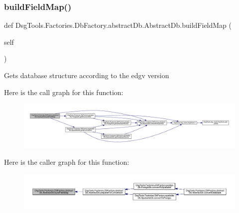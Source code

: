 \subsubsection{\texorpdfstring{build\+Field\+Map()}{buildFieldMap()}}
{\footnotesize\ttfamily def Dsg\+Tools.\+Factories.\+Db\+Factory.\+abstract\+Db.\+Abstract\+Db.\+build\+Field\+Map (\begin{DoxyParamCaption}\item[{}]{self }\end{DoxyParamCaption})}

\begin{DoxyVerb}Gets database structure according to the edgv version
\end{DoxyVerb}
 Here is the call graph for this function\+:
\nopagebreak
\begin{figure}[H]
\begin{center}
\leavevmode
\includegraphics[width=350pt]{class_dsg_tools_1_1_factories_1_1_db_factory_1_1abstract_db_1_1_abstract_db_abe4a9ee62e78b6583a4e7c4f48dee173_cgraph}
\end{center}
\end{figure}
Here is the caller graph for this function\+:
\nopagebreak
\begin{figure}[H]
\begin{center}
\leavevmode
\includegraphics[width=350pt]{class_dsg_tools_1_1_factories_1_1_db_factory_1_1abstract_db_1_1_abstract_db_abe4a9ee62e78b6583a4e7c4f48dee173_icgraph}
\end{center}
\end{figure}
\mbox{\label{class_dsg_tools_1_1_factories_1_1_db_factory_1_1abstract_db_1_1_abstract_db_a544337a6752eae3f22d21610f4ce1dab}} 
